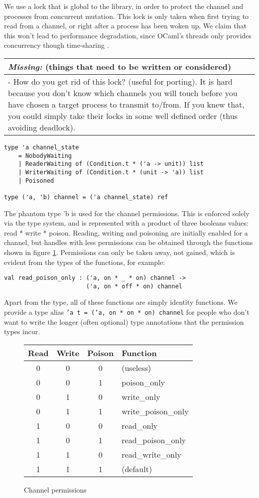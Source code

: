 \documentclass[a4paper,12pt]{article}
\newcommand{\missing}[1]{
  \begin{tabular}{|p{11cm}|}
    \hline
    \emph{Missing:} {\scriptsize (things that need to be written or considered)} \\
    \hline
    #1
    \hline
  \end{tabular}
}
\begin{document}
We use a lock that is global to the library, in order to protect the channel and processes from
concurrent mutation. This lock is only taken when first trying to read from a channel, or
right after a process has been woken up. We claim that this won't lead to performance degradation,
since OCaml's threads only provides concurrency though time-sharing \cite{ocaml-threads}.

\missing{
- How do you get rid of this lock? (useful for porting). It is hard because you don't know which
channels you will touch before you have chosen a target process to transmit to/from. If you knew
that, you could simply take their locks in some well defined order (thus avoiding deadlock). \\
}

\begin{verbatim}
type 'a channel_state
    = NobodyWaiting 
    | ReaderWaiting of (Condition.t * ('a -> unit)) list
    | WriterWaiting of (Condition.t * (unit -> 'a)) list
    | Poisoned

type ('a, 'b) channel = ('a channel_state) ref
\end{verbatim}

The phantom type 'b is used for the channel permissions. This is enforced solely via the type
system, and is represented with a product of three booleans values: read * write * poison.
Reading, writing and poisoning are initially enabled for a channel, but handles with less 
permissions can be obtained through the functions shown in figure \ref{channel-permissions}. 
Permissions can only be taken away, not gained, which is evident from the types of the 
functions, for example: 

\begin{verbatim}
val read_poison_only : ('a, on * _ * on) channel -> 
                       ('a, on * off * on) channel
\end{verbatim}

Apart from the type, all of these functions are simply identity functions. We provide a
type alias \texttt{'a t = ('a, on * on * on) channel} for people who don't want to write the
longer (often optional) type annotations that the permission types incur.

\begin{figure}[h]
\centering
\begin{tabular}{c|c|c|l}
Read & Write & Poison & Function \\
\hline
0 & 0 & 0 & (useless) \\
0 & 0 & 1 & poison\_only \\
0 & 1 & 0 & write\_only \\
0 & 1 & 1 & write\_poison\_only \\
1 & 0 & 0 & read\_only \\
1 & 0 & 1 & read\_poison\_only \\
1 & 1 & 0 & read\_write\_only \\
1 & 1 & 1 & (default) \\
\end{tabular}
\caption{Channel permissions}
\label{channel-permissions}
\end{figure}
\end{document}
